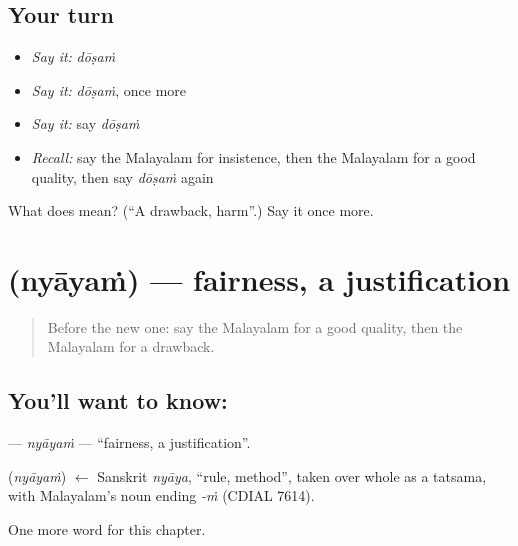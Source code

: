 \subsection*{Your turn}
\begin{itemize}
\raggedright
  \item \emph{Say it:} \emph{dōṣaṁ}
  \item \emph{Say it:} \emph{dōṣaṁ}, once more
  \item \emph{Say it:} say \emph{dōṣaṁ}
  \item \emph{Recall:} say the Malayalam for insistence, then the Malayalam for a good quality, then say \emph{dōṣaṁ} again
\end{itemize}

\begin{tcolorbox}[breakable,colback=teal!4,colframe=teal!35!black,title={Before you move on}]
What does  mean? (\textquotedblleft{}A drawback, harm\textquotedblright{}.) Say it once more.
\end{tcolorbox}
\section[\texorpdfstring{\ml{ന്യായം} (nyāyaṁ)}{ന്യായം (nyāyaṁ)}]{ (nyāyaṁ) — fairness, a justification}

\label{lesson:ML-C202-nyayam}



\begin{quote}
Before the new one: say the Malayalam for a good quality, then the Malayalam for a drawback.
\end{quote}

\subsection*{You'll want to know: }
\textbf{} — \emph{nyāyaṁ} — \textquotedblleft{}fairness, a justification\textquotedblright{}.

\begin{cousinweb}
\textbf{} (\emph{nyāyaṁ}) $\leftarrow$ Sanskrit \emph{nyāya}, \textquotedblleft{}rule, method\textquotedblright{}, taken over whole as a tatsama, with Malayalam's noun ending \emph{-ṁ} (CDIAL 7614).
\end{cousinweb}

\begin{grammarlens}[title={What you've built}]
One more word for this chapter.
\end{grammarlens}

